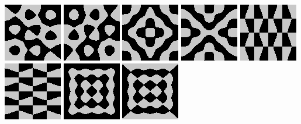 \includegraphics{o/dchladni_049.png}
\includegraphics{o/dchladni_050.png}
\includegraphics{o/dchladni_051.png}
\includegraphics{o/dchladni_052.png}
\includegraphics{o/dchladni_053.png}
\includegraphics{o/dchladni_054.png}
\includegraphics{o/dchladni_055.png}
\includegraphics{o/dchladni_056.png}

